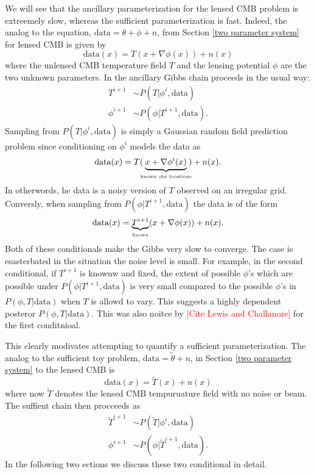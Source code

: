 \documentclass[11pt]{article}
\begin{document}
We will see that the ancillary parameterization for the lensed CMB problem is extreemely slow, whereas the sufficient parameterization is fast. Indeed, the analog to the equation, $\text{data} = \theta +\phi + n$,  from Section \ref{two parameter system} for lensed CMB is given by
\[\text{data}(x) = T(x+\nabla \phi(x)) + n(x)\]
where the unlensed  CMB temperature field $T$ and the lensing potential $\phi$ are the two unknown parameters. In the ancillary Gibbs chain proceeds in the usual way:
\begin{align}
T^{i+1}&\sim P(T |  \phi^{i},\text{data})\\
\phi^{i+1}&\sim P(\phi | T^{i+1},  \text{data}).
\end{align}
Sampling from $P(T |  \phi^{i},\text{data})$ is simply a Gaussian random field prediction problem since conditioning on $\phi^i$ models the data as
\[ \text{data}(x) = T(\!\!\underbrace{x+\nabla\phi^i(x)}_\text{\tiny known obs locations}\!\!) + n(x).\]
In otherwords, he data is a noisy version of  $T$ observed on an irregular grid. 
Conversly, when sampling from $P(\phi |  T^{i+1},\text{data})$ the data is of the form
\[ \text{data}(x) = \underbrace{T^{i+1}}_{\text{\tiny known}}(x+\nabla\phi(x)) + n(x). \]
Both of these conditionals make the Gibbs very slow to converge. The case is esasterbated in the situation the noise level is small. For example, in the second conditional, if $T^{i+1}$ is knownw and fixed, the extent of possible  $\phi$'s which are possible under $P(\phi|T^{i+1},\text{data})$  is very small compared to the possible $\phi$'s  in $P(\phi, T| \text{data})$ when $T$ is allowd to vary. 
This suggests a highly dependent posteror $P(\phi, T| \text{data})$. 
This was also noitce by \textcolor{red}{[Cite Lewis and Challanore]} for the first conditnioal.

This clearly modivates attempting to quantify a  sufficient parameterization. The analog to the sufficient toy problem, $\text{data} = \widetilde\theta + n$,  in Section \ref{two parameter system} to the lensed CMB is 
\[\text{data}(x) = \widetilde T(x) + n(x)\]
where now $\widetilde T$ denotes the lensed CMB tempuruature field with no noise or beam.
The suffient chain then procceeds as
\begin{align}
\widetilde T^{i+1}&\sim P(\widetilde T |  \phi^{i},\text{data})\\
\phi^{i+1}&\sim P(\phi | \widetilde T^{i+1},  \text{data}).
\end{align}
In the following two ections we discuss these two conditional in detail.
\end{document}
